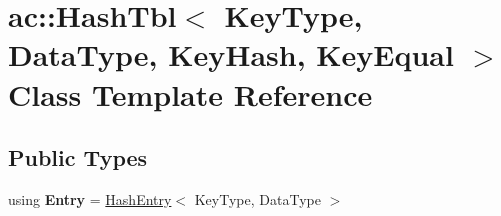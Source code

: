 \hypertarget{classac_1_1HashTbl}{}\section{ac\+:\+:Hash\+Tbl$<$ Key\+Type, Data\+Type, Key\+Hash, Key\+Equal $>$ Class Template Reference}
\label{classac_1_1HashTbl}
\subsection*{Public Types}
\begin{DoxyCompactItemize}
\item 
\mbox{\label{classac_1_1HashTbl_aa82a60fdfe94eb0f36016c5f1d400bcc}} 
using {\bfseries Entry} = \hyperlink{classac_1_1HashEntry}{Hash\+Entry}$<$ Key\+Type, Data\+Type $>$
\end{DoxyCompactItemize}
